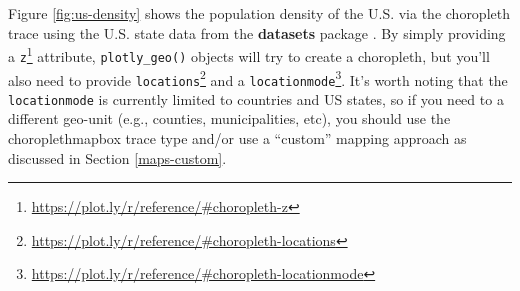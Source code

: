 \documentclass[
  12pt,
]{krantz}
\newenvironment{Shaded}{\begin{snugshade}}{\end{snugshade}}
\newcommand{\DataTypeTok}[1]{\textcolor[rgb]{0.13,0.29,0.53}{#1}}
\newcommand{\DecValTok}[1]{\textcolor[rgb]{0.00,0.00,0.81}{#1}}
\newcommand{\KeywordTok}[1]{\textcolor[rgb]{0.13,0.29,0.53}{\textbf{#1}}}
\newcommand{\NormalTok}[1]{#1}
\newcommand{\OperatorTok}[1]{\textcolor[rgb]{0.81,0.36,0.00}{\textbf{#1}}}
\newcommand{\StringTok}[1]{\textcolor[rgb]{0.31,0.60,0.02}{#1}}
\renewcommand{\href}[2]{#2\footnote{\url{#1}}}
\begin{document}
Figure \ref{fig:us-density} shows the population density of the U.S. via the choropleth trace using the U.S. state data from the \textbf{datasets} package \citep{RCore}. By simply providing a \href{https://plot.ly/r/reference/\#choropleth-z}{\texttt{z}} attribute, \texttt{plotly\_geo()} objects will try to create a choropleth, but you'll also need to provide \href{https://plot.ly/r/reference/\#choropleth-locations}{\texttt{locations}} and a \href{https://plot.ly/r/reference/\#choropleth-locationmode}{\texttt{locationmode}}. It's worth noting that the \texttt{locationmode} is currently limited to countries and US states, so if you need to a different geo-unit (e.g., counties, municipalities, etc), you should use the choroplethmapbox trace type and/or use a ``custom'' mapping approach as discussed in Section \ref{maps-custom}.


\begin{Shaded}
\end{Shaded}
\end{document}
